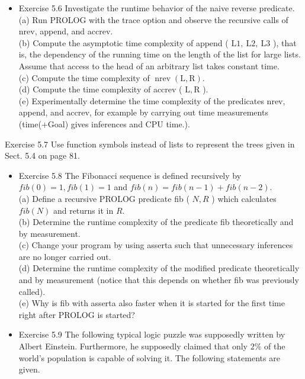 \documentclass[10pt]{book}
\begin{document}
\begin{itemize}
  \item Exercise 5.6 Investigate the runtime behavior of the naive reverse predicate.\\

(a) Run PROLOG with the trace option and observe the recursive calls of nrev, append, and accrev.\\
(b) Compute the asymptotic time complexity of append ( $\mathrm{L} 1, \mathrm{~L} 2, \mathrm{~L} 3$ ), that is, the dependency of the running time on the length of the list for large lists. Assume that access to the head of an arbitrary list takes constant time.\\
(c) Compute the time complexity of $\operatorname{nrev}(\mathrm{L}, \mathrm{R})$.\\
(d) Compute the time complexity of accrev ( $\mathrm{L}, \mathrm{R}$ ).\\
(e) Experimentally determine the time complexity of the predicates nrev, append, and accrev, for example by carrying out time measurements (time(+Goal) gives inferences and CPU time.).
\end{itemize}

Exercise 5.7 Use function symbols instead of lists to represent the trees given in Sect. 5.4 on page 81.

\begin{itemize}
  \item Exercise 5.8 The Fibonacci sequence is defined recursively by $f i b(0)=1, f i b(1)=1$ and $f i b(n)=f i b(n-1)+f i b(n-2)$.\\
(a) Define a recursive PROLOG predicate fib ( $N, R$ ) which calculates $f i b(N)$ and returns it in $R$.\\
(b) Determine the runtime complexity of the predicate fib theoretically and by measurement.\\
(c) Change your program by using asserta such that unnecessary inferences are no longer carried out.\\
(d) Determine the runtime complexity of the modified predicate theoretically and by measurement (notice that this depends on whether fib was previously called).\\
(e) Why is fib with asserta also faster when it is started for the first time right after PROLOG is started?
  \item Exercise 5.9 The following typical logic puzzle was supposedly written by Albert Einstein. Furthermore, he supposedly claimed that only $2 \%$ of the world's population is capable of solving it. The following statements are given.
\end{itemize}
\end{document}
